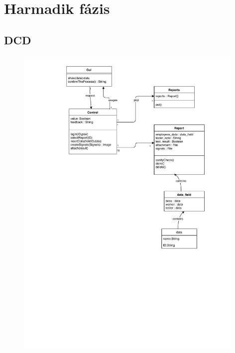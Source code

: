 \chapter{Harmadik fázis}\label{sect:ThirdPhase}

\section{DCD}

\begin{figure}[!h]
	\centering
	\includegraphics[trim = 10mm 10mm 0mm 10mm,clip,width=110mm, keepaspectratio]{figures/dcd.pdf}
\end{figure}